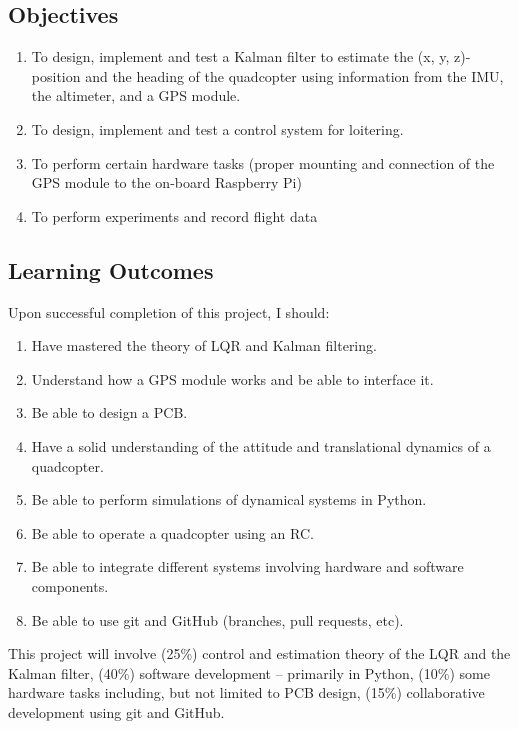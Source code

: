 \documentclass{report}
\begin{document}
\newpage
\subsection*{Objectives}
\begin{enumerate}
    \item To design, implement and test a Kalman filter to estimate the (x, y,
    z)-	position and the heading of the quadcopter using information from the
    IMU, the altimeter, and a GPS module.
    \item To design, implement and test a control system for loitering.
    \item To perform certain hardware tasks (proper mounting and connection of
    the GPS module to the on-board Raspberry Pi)
    \item To perform experiments and record flight data
\end{enumerate}

\subsection*{Learning Outcomes}
Upon successful completion of this project, I should:
\begin{enumerate}
    \item Have mastered the theory of LQR and Kalman filtering.
    \item Understand how a GPS module works and be able to interface it.
    \item Be able to design a PCB.
    \item Have a solid understanding of the attitude and translational dynamics
    of a quadcopter.
    \item Be able to perform simulations of dynamical systems in Python.
    \item Be able to operate a quadcopter using an RC.
    \item Be able to integrate different systems involving hardware and software
    components.
    \item Be able to use git and GitHub (branches, pull requests, etc).
\end{enumerate}
This project will involve (25\%) control and estimation theory of the LQR and
the Kalman filter, (40\%) software development – primarily in Python, (10\%)
some hardware tasks including, but not limited to PCB design, (15\%)
collaborative development using git and GitHub.

\newpage
\tableofcontents
\newpage
\end{document}
